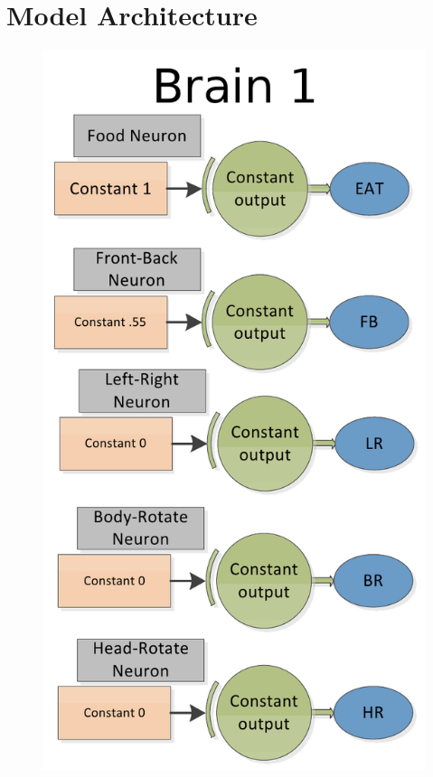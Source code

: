 \section{Model Architecture} \label{ap:arch}

\begin{figure}
\begin{center}
  \includegraphics[scale=.3]{img/arch1.png}
\end{center}
\end{figure}

